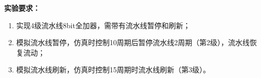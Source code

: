 \textbf{实验要求：}



\begin{enumerate}
    \item 实现4级流水线8bit全加器，需带有流水线暂停和刷新；
    \item 模拟流水线暂停，仿真时控制10周期后暂停流水线2周期（第2级），流水线恢复流动；
    \item 模拟流水线刷新，仿真时控制15周期时流水线刷新（第3级）。

\end{enumerate}